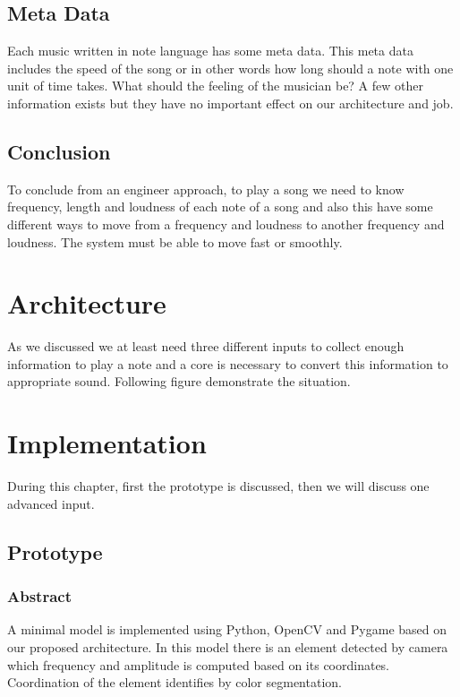\documentclass{report}
\begin{document}
\section{Meta Data}
Each music written in note language has some meta data. This meta data includes the speed of the song or in other words how long should a note with one unit of time takes. What should the feeling of the musician be? A few other information exists but they have no important effect on our architecture and job. 


\section{Conclusion}
To conclude from an engineer approach, to play a song we need to know frequency, length and loudness of each note of a song and also this have some different ways to move from a frequency and loudness to another frequency and loudness. The system must be able to move fast or smoothly. 


\chapter{Architecture}
As we discussed we at least need three different inputs to collect enough information to play a note and a core is necessary to convert this information to appropriate sound. Following figure demonstrate the situation.


\pagebreak
\chapter{Implementation}
During this chapter, first the prototype is discussed, then we will discuss one advanced input. 

\section{Prototype}

\subsection{Abstract}{A minimal model is implemented using Python, OpenCV and Pygame based on our proposed architecture. In this model there is an element detected by camera which frequency and amplitude is computed based on its coordinates. Coordination of the element identifies by color segmentation.}

\end{document}
